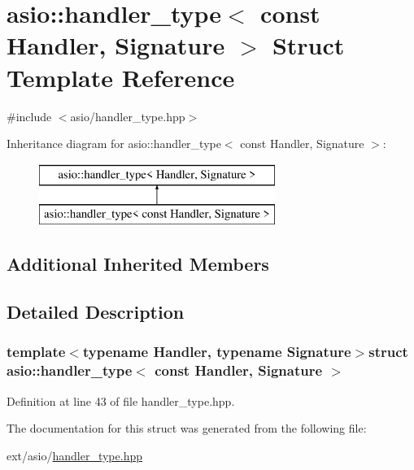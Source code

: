 \hypertarget{structasio_1_1handler__type_3_01const_01_handler_00_01_signature_01_4}{}\section{asio\+:\+:handler\+\_\+type$<$ const Handler, Signature $>$ Struct Template Reference}
\label{structasio_1_1handler__type_3_01const_01_handler_00_01_signature_01_4}


{\ttfamily \#include $<$asio/handler\+\_\+type.\+hpp$>$}

Inheritance diagram for asio\+:\+:handler\+\_\+type$<$ const Handler, Signature $>$\+:\begin{figure}[H]
\begin{center}
\leavevmode
\includegraphics[height=2.000000cm]{structasio_1_1handler__type_3_01const_01_handler_00_01_signature_01_4}
\end{center}
\end{figure}
\subsection*{Additional Inherited Members}


\subsection{Detailed Description}
\subsubsection*{template$<$typename Handler, typename Signature$>$struct asio\+::handler\+\_\+type$<$ const Handler, Signature $>$}



Definition at line 43 of file handler\+\_\+type.\+hpp.



The documentation for this struct was generated from the following file\+:\begin{DoxyCompactItemize}
\item 
ext/asio/\hyperlink{handler__type_8hpp}{handler\+\_\+type.\+hpp}\end{DoxyCompactItemize}
